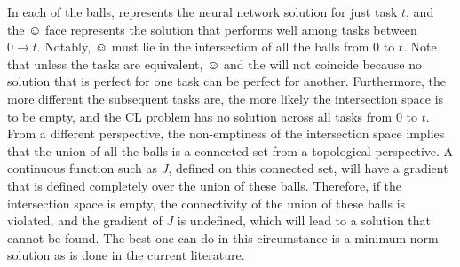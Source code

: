 In each of the balls,  represents the neural network solution for 
just task $t$, and the $\smiley{}$ face 
represents the solution that performs well among tasks 
between $0 \rightarrow t.$  Notably,  $\smiley{}$ must lie in 
the intersection of all the balls from $0$ to $t$. 
Note that unless the tasks are equivalent,  $\smiley{}$ 
and the  will not coincide because no solution 
that is perfect for one task can be perfect for another. 
Furthermore, the more different the subsequent tasks are, the more likely
the intersection space is  to be empty, and the CL problem has no solution 
across all tasks from $0$ to $t$. From a different perspective, the non-emptiness 
of the intersection space implies 
that the union of all the balls is a connected set from a 
topological perspective. A continuous 
function such as $J$, defined on this 
connected set, will have a gradient that is 
defined completely over the union of these balls. Therefore, 
if the intersection space is empty, the connectivity of the union
of these balls is violated, and the gradient of $J$ is undefined, which will lead to 
a solution that cannot be found. The best one can do in this circumstance is a 
minimum norm solution as is done in the current literature.


